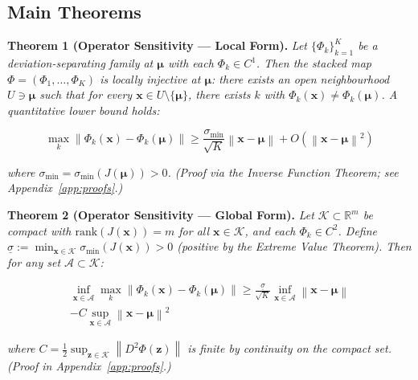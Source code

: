 \documentclass[journal]{IEEEtran}
\newcommand{\R}{\mathbb{R}}
\newcommand{\norm}[1]{\left\lVert#1\right\rVert}
\begin{document}
\subsection{Main Theorems}

\vspace{0.5em}

\textbf{Theorem 1 (Operator Sensitivity --- Local Form).} \textit{Let $\{\Phi_k\}_{k=1}^K$ be a deviation-separating family at $\boldsymbol{\mu}$ with each $\Phi_k \in C^1$. Then the stacked map $\Phi = (\Phi_1, \ldots, \Phi_K)$ is locally injective at $\boldsymbol{\mu}$: there exists an open neighbourhood $U \ni \boldsymbol{\mu}$ such that for every $\mathbf{x} \in U \setminus \{\boldsymbol{\mu}\}$, there exists $k$ with $\Phi_k(\mathbf{x}) \neq \Phi_k(\boldsymbol{\mu})$. A quantitative lower bound holds:}

\begin{equation}
\max_{k} \norm{\Phi_k(\mathbf{x}) - \Phi_k(\boldsymbol{\mu})} \geq \frac{\sigma_{\min}}{\sqrt{K}} \norm{\mathbf{x} - \boldsymbol{\mu}} + O(\norm{\mathbf{x} - \boldsymbol{\mu}}^2)
\label{eq:quantitative}
\end{equation}

\textit{where $\sigma_{\min} = \sigma_{\min}(J(\boldsymbol{\mu})) > 0$. (Proof via the Inverse Function Theorem; see Appendix~\ref{app:proofs}.)}

\vspace{0.5em}

\textbf{Theorem 2 (Operator Sensitivity --- Global Form).} \textit{Let $\mathcal{K} \subset \R^m$ be compact with $\text{rank}(J(\mathbf{x})) = m$ for all $\mathbf{x} \in \mathcal{K}$, and each $\Phi_k \in C^2$. Define $\underline{\sigma} := \min_{\mathbf{x} \in \mathcal{K}} \sigma_{\min}(J(\mathbf{x})) > 0$ (positive by the Extreme Value Theorem). Then for any set $\mathcal{A} \subset \mathcal{K}$:}

\begin{multline}
\inf_{\mathbf{x} \in \mathcal{A}} \max_{k} \norm{\Phi_k(\mathbf{x}) - \Phi_k(\boldsymbol{\mu})}
  \geq \frac{\underline{\sigma}}{\sqrt{K}} \inf_{\mathbf{x} \in \mathcal{A}} \norm{\mathbf{x} - \boldsymbol{\mu}} \\
  - C \sup_{\mathbf{x} \in \mathcal{A}} \norm{\mathbf{x} - \boldsymbol{\mu}}^2
\label{eq:global}
\end{multline}

\textit{where $C = \frac{1}{2}\sup_{\mathbf{z} \in \mathcal{K}} \norm{D^2 \Phi(\mathbf{z})}$ is finite by continuity on the compact set. (Proof in Appendix~\ref{app:proofs}.)}
\end{document}
